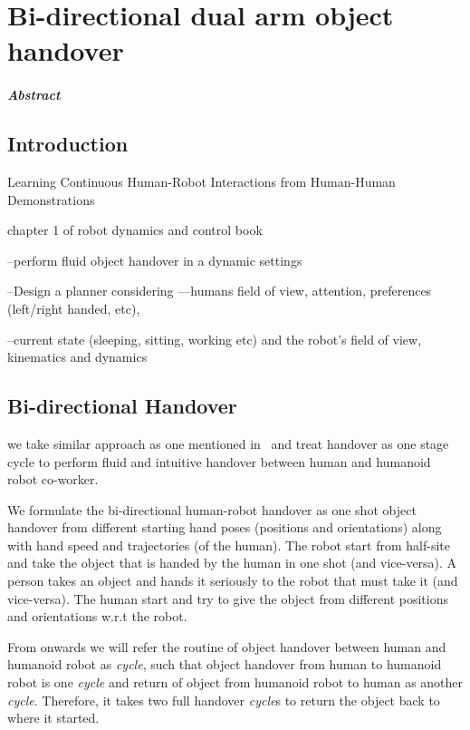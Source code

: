 \chapter{Bi-directional dual arm object handover}


\paragraph*{Abstract}

\clearpage
\section{Introduction}

Learning Continuous Human-Robot Interactions from Human-Human Demonstrations ~\cite{vogt2017learning}

chapter 1 of robot dynamics and control book~\cite{spong2008robot}

--perform fluid object handover in a dynamic settings

--Design a planner considering —humans field of view, attention, preferences (left/right handed, etc),

--current state (sleeping, sitting, working etc) and the robot’s field of view, kinematics and dynamics



\clearpage
\section{Bi-directional Handover}

we take similar approach as one mentioned in~\cite{medina2016human} and treat handover as one stage cycle to perform fluid and intuitive handover between human and humanoid robot co-worker.

We formulate the bi-directional human-robot handover as one shot object handover from different starting hand poses (positions and orientations) along with hand speed and trajectories (of the human). The robot start from half-site and take the object that is handed by the human in one shot (and vice-versa). A person takes an object and hands it seriously to the robot that must take it (and vice-versa). The human start and try to give the object from different positions and orientations w.r.t the robot.

From onwards we will refer the routine of object handover between human and humanoid robot as \textit{cycle}, such that object handover from human to humanoid robot is one \textit{cycle} and return of object from humanoid robot to human as another \textit {cycle}. Therefore, it takes two full handover \textit{cycle}s to return the object back to where it started.

